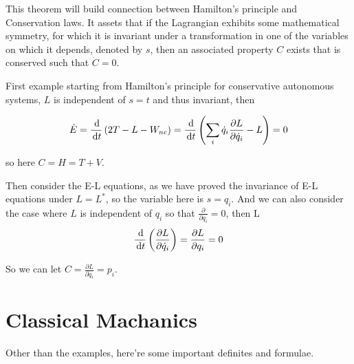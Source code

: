 \documentclass{article}
\begin{document}
\begin{theorem}
    This theorem will build connection between Hamilton's principle and Conservation laws. It assets that if the Lagrangian exhibits some mathematical symmetry, for which it is invariant under a transformation in one of the variables on which it depends, denoted by \(s\), then an associated property \(C\) exists that is conserved such that \(\dot C=0\).
\end{theorem}


First example starting from Hamilton's principle for conservative autonomous systems, \(L\) is independent of \(s=t\) and thus invariant, then

\[\dot E=\frac{\,\mathrm{d}}{\,\mathrm{d} t}\left( 2T-L-W_{nc} \right)=\frac{\,\mathrm{d}}{\,\mathrm{d} t}\left( \sum_i \dot q_i \frac{\partial L}{\partial \dot q_i}-L \right)=0\]

so here \(C=H=T+V\).

Then consider the E-L equations, as we have proved the invariance of E-L equations under \(L=L^*\), so the variable here is \(s=q_i\). And we can also consider the case where \(L\) is independent of \(q_i\) so that \(\frac{\partial}{\partial q_i}=0\), then
 L
\[\frac{\,\mathrm{d}}{\,\mathrm{d} t} \left( \frac{\partial L}{\partial \dot q_i} \right)=\frac{\partial L}{\partial q_i}=0\]

So we can let \(C=\frac{\partial L}{\partial \dot q_i}=p_i\).

\section{Classical Machanics}

Other than the examples, here're some important definites and formulae.
\end{document}
